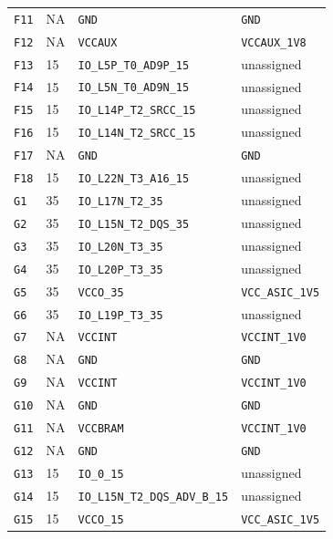 \documentclass[11pt,a4paper]{article}
\begin{document}
\begin{longtable}{@{}P{13mm}P{13mm}P{78mm}P{62mm}@{}}
\nolinkurl{F11} & NA & \nolinkurl{GND} & \nolinkurl{GND} \\
\nolinkurl{F12} & NA & \nolinkurl{VCCAUX} & \nolinkurl{VCCAUX_1V8} \\
\nolinkurl{F13} & 15 & \nolinkurl{IO_L5P_T0_AD9P_15} & \textcolor{muted}{unassigned} \\
\nolinkurl{F14} & 15 & \nolinkurl{IO_L5N_T0_AD9N_15} & \textcolor{muted}{unassigned} \\
\nolinkurl{F15} & 15 & \nolinkurl{IO_L14P_T2_SRCC_15} & \textcolor{muted}{unassigned} \\
\nolinkurl{F16} & 15 & \nolinkurl{IO_L14N_T2_SRCC_15} & \textcolor{muted}{unassigned} \\
\nolinkurl{F17} & NA & \nolinkurl{GND} & \nolinkurl{GND} \\
\nolinkurl{F18} & 15 & \nolinkurl{IO_L22N_T3_A16_15} & \textcolor{muted}{unassigned} \\
\nolinkurl{G1} & 35 & \nolinkurl{IO_L17N_T2_35} & \textcolor{muted}{unassigned} \\
\nolinkurl{G2} & 35 & \nolinkurl{IO_L15N_T2_DQS_35} & \textcolor{muted}{unassigned} \\
\nolinkurl{G3} & 35 & \nolinkurl{IO_L20N_T3_35} & \textcolor{muted}{unassigned} \\
\nolinkurl{G4} & 35 & \nolinkurl{IO_L20P_T3_35} & \textcolor{muted}{unassigned} \\
\nolinkurl{G5} & 35 & \nolinkurl{VCCO_35} & \nolinkurl{VCC_ASIC_1V5} \\
\nolinkurl{G6} & 35 & \nolinkurl{IO_L19P_T3_35} & \textcolor{muted}{unassigned} \\
\nolinkurl{G7} & NA & \nolinkurl{VCCINT} & \nolinkurl{VCCINT_1V0} \\
\nolinkurl{G8} & NA & \nolinkurl{GND} & \nolinkurl{GND} \\
\nolinkurl{G9} & NA & \nolinkurl{VCCINT} & \nolinkurl{VCCINT_1V0} \\
\nolinkurl{G10} & NA & \nolinkurl{GND} & \nolinkurl{GND} \\
\nolinkurl{G11} & NA & \nolinkurl{VCCBRAM} & \nolinkurl{VCCINT_1V0} \\
\nolinkurl{G12} & NA & \nolinkurl{GND} & \nolinkurl{GND} \\
\nolinkurl{G13} & 15 & \nolinkurl{IO_0_15} & \textcolor{muted}{unassigned} \\
\nolinkurl{G14} & 15 & \nolinkurl{IO_L15N_T2_DQS_ADV_B_15} & \textcolor{muted}{unassigned} \\
\nolinkurl{G15} & 15 & \nolinkurl{VCCO_15} & \nolinkurl{VCC_ASIC_1V5} \\

\end{longtable}
\end{document}
